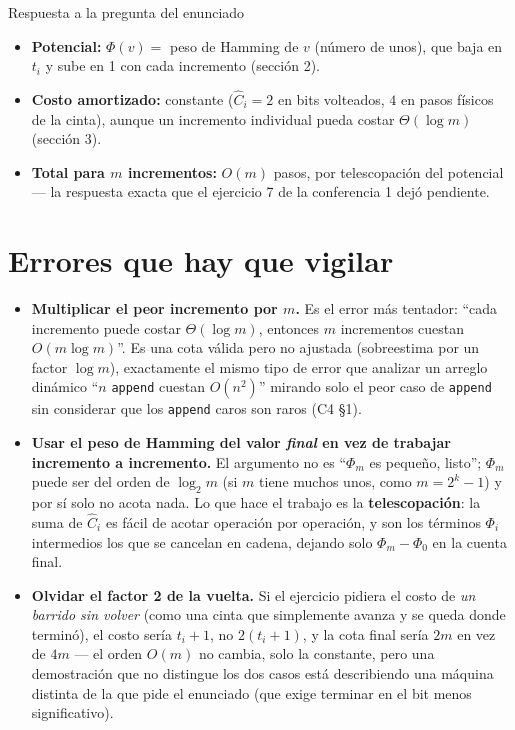 \documentclass[11pt]{article}
\begin{document}
\begin{resultado}{Respuesta a la pregunta del enunciado}
\begin{itemize}[leftmargin=14pt]
\item \textbf{Potencial:} $\Phi(v)=$ peso de Hamming de $v$ (número de unos), que baja en $t_i$ y sube en 1
con cada incremento (sección 2).
\item \textbf{Costo amortizado:} constante ($\hat C_i=2$ en bits volteados, $4$ en pasos físicos de la
cinta), aunque un incremento individual pueda costar $\Theta(\log m)$ (sección 3).
\item \textbf{Total para $m$ incrementos:} $O(m)$ pasos, por telescopación del potencial --- la respuesta
exacta que el ejercicio 7 de la conferencia 1 dejó pendiente.
\end{itemize}
\end{resultado}

\section*{Errores que hay que vigilar}

\begin{alerta}{}
\begin{itemize}[leftmargin=14pt]
\item \textbf{Multiplicar el peor incremento por $m$.} Es el error más tentador: ``cada incremento puede
costar $\Theta(\log m)$, entonces $m$ incrementos cuestan $O(m\log m)$''. Es una cota válida pero no
ajustada (sobreestima por un factor $\log m$), exactamente el mismo tipo de error que analizar un arreglo
dinámico ``$n$ \texttt{append} cuestan $O(n^2)$'' mirando solo el peor caso de \texttt{append} sin
considerar que los \texttt{append} caros son raros (C4 §1).
\item \textbf{Usar el peso de Hamming del valor \emph{final} en vez de trabajar incremento a incremento.}
El argumento no es ``$\Phi_m$ es pequeño, listo''; $\Phi_m$ puede ser del orden de $\log_2 m$ (si $m$ tiene
muchos unos, como $m=2^k-1$) y por sí solo no acota nada. Lo que hace el trabajo es la \textbf{telescopación}: la suma de
$\hat C_i$ es fácil de acotar operación por operación, y son los términos $\Phi_i$ intermedios los que se
cancelan en cadena, dejando solo $\Phi_m-\Phi_0$ en la cuenta final.
\item \textbf{Olvidar el factor 2 de la vuelta.} Si el ejercicio pidiera el costo de \emph{un barrido sin
volver} (como una cinta que simplemente avanza y se queda donde terminó), el costo sería $t_i+1$, no
$2(t_i+1)$, y la cota final sería $2m$ en vez de $4m$ --- el orden $O(m)$ no cambia, solo la constante,
pero una demostración que no distingue los dos casos está describiendo una máquina distinta de la que pide
el enunciado (que exige terminar en el bit menos significativo).
\end{itemize}
\end{alerta}
\end{document}
